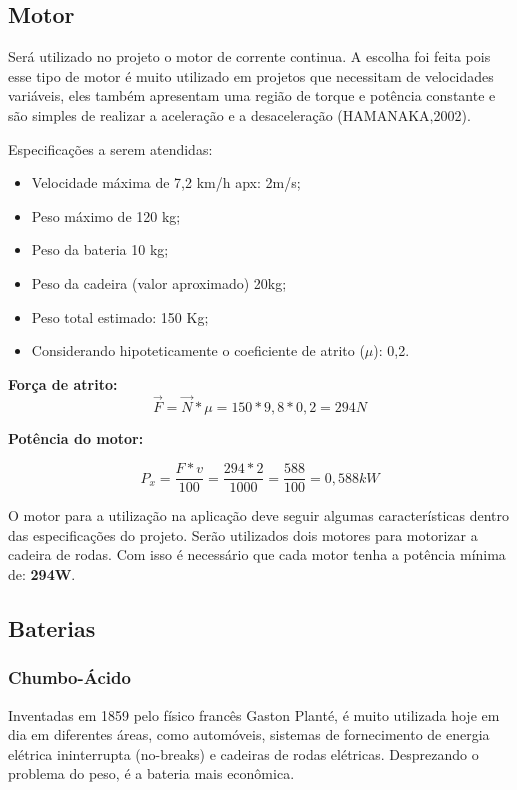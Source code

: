 \subsection{Motor}
Será utilizado no projeto o motor de corrente continua. A escolha foi feita pois esse tipo de motor é muito utilizado em projetos que necessitam de velocidades variáveis, eles também apresentam uma região de torque e potência constante e são simples de realizar a aceleração e a desaceleração (HAMANAKA,2002).

Especificações a serem atendidas:
\begin{itemize}
 \item Velocidade máxima de 7,2 km/h apx: 2m/s;
 \item Peso máximo de 120 kg;
 \item Peso da bateria 10 kg;
 \item Peso da cadeira (valor aproximado) 20kg;
 \item Peso total estimado: 150 Kg;
 \item Considerando hipoteticamente o coeficiente de atrito ($\mu$): 0,2.
\end{itemize}

\textbf{Força de atrito:}
\begin{equation}
 \overrightarrow{F} = \overrightarrow{N} * \mu = 150 * 9,8 * 0,2 = 294N
\end{equation}

\textbf{Potência do motor:}

\begin{equation}
 P_{x} = \frac{F * v}{100} = \frac{294 * 2}{1000} = \frac{588}{100} = 0,588kW
\end{equation}

O motor para a utilização na aplicação deve seguir algumas características dentro das especificações do projeto. Serão utilizados dois motores para motorizar a cadeira de rodas. Com isso é necessário que cada motor tenha a potência mínima de: \textbf{294W}.

\subsection{Baterias}
\subsubsection{Chumbo-Ácido}
Inventadas em 1859 pelo físico francês Gaston Planté, é muito utilizada hoje em dia em diferentes áreas, como automóveis, sistemas de fornecimento de energia elétrica ininterrupta (no-breaks) e cadeiras de rodas elétricas. Desprezando o problema do peso, é a bateria mais econômica.

